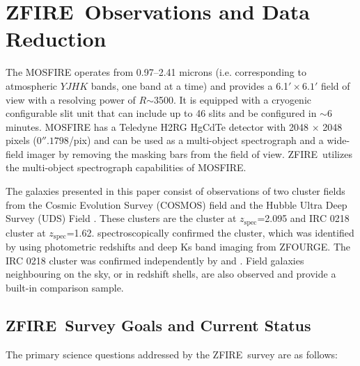 \documentclass[iop]{emulateapj}
\newcommand{\around}{$\sim$}
\newcommand{\zspec}{$z_{\mathrm{spec}}$}
\begin{document}

\section{ZFIRE\ Observations and Data Reduction}
\label{sec:survey}


The MOSFIRE \citep{McLean2008,McLean2010,McLean2012} operates from 0.97--2.41 microns (i.e. corresponding to atmospheric $YJHK$ bands, one band at a
time) and provides a 6.1$'\times 6.1'$ field of view with a resolving power of $R$\around3500.  It is equipped with a cryogenic configurable slit unit that can include up to 46 slits and be configured in
\around6 minutes.  MOSFIRE has a Teledyne H2RG HgCdTe detector with
2048 $\times$ 2048 pixels ($0''.1798$/pix) and can be used as a multi-object spectrograph and a wide-field imager by removing the masking bars from the field of view.  ZFIRE\ utilizes the multi-object spectrograph capabilities of MOSFIRE.

The galaxies presented in this paper consist of observations of two cluster fields from the Cosmic Evolution Survey (COSMOS) field \citep{Scoville2007} and the Hubble Ultra Deep Survey (UDS) Field \citep{Beckwith2006}.
These clusters are the \cite{Yuan2014} cluster at \zspec=2.095 and IRC 0218 cluster \citep{Papovich2010,Tanaka2010,Tran2015} at \zspec=1.62.
\cite{Yuan2014} spectroscopically confirmed the cluster, which was identified by \citet{Spitler2012} using photometric redshifts and deep Ks band imaging from ZFOURGE.
The IRC 0218 cluster was confirmed independently by \citet{Papovich2010} and \citet{Tanaka2010}.
Field galaxies neighbouring on the sky, or in redshift shells, are also observed and provide a built-in comparison sample.

\subsection{ZFIRE\ Survey Goals and Current Status}


The primary science questions addressed by the ZFIRE\ survey are as follows:
\end{document}
